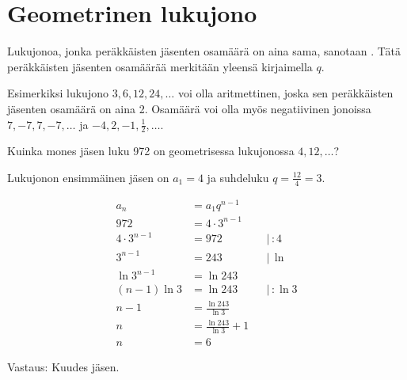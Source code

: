 \section{Geometrinen lukujono}

Lukujonoa, jonka peräkkäisten jäsenten osamäärä on aina sama, sanotaan . Tätä peräkkäisten jäsenten osamäärää merkitään yleensä kirjaimella $q$.



Esimerkiksi lukujono $3, 6, 12, 24, \ldots$ voi olla aritmettinen, joska sen peräkkäisten jäsenten osamäärä on aina 2. Osamäärä voi olla myös negatiivinen jonoissa  $7, -7, 7, -7, \ldots$ ja  $ -4, 2, -1, \frac{1}{2}, \ldots$.

\begin{esimerkki}

Kuinka mones jäsen luku 972 on geometrisessa lukujonossa $4, 12,  \ldots$?

Lukujonon ensimmäinen jäsen on $a_1=4$ ja suhdeluku $q=\frac{12}{4}=3$.

\begin{align*}
	a_n &= a_1q^{n-1}  \\
	972 &= 4 \cdot 3^{n-1}  \\
	4 \cdot 3^{n-1} &= 972 & & | \, :4 \\
	3^{n-1} &= 243 & & | \, \ln\\
	\ln 3^{n-1} &= \ln 243 \\
	(n-1)\ln 3 &= \ln 243  & & | \, : \ln 3 \\
	n-1 &= \frac{\ln 243}{\ln 3} \\
	n &= \frac{\ln 243}{\ln 3} +1\\
	n &= 6
\end{align*}

Vastaus: Kuudes jäsen.

\end{esimerkki}



